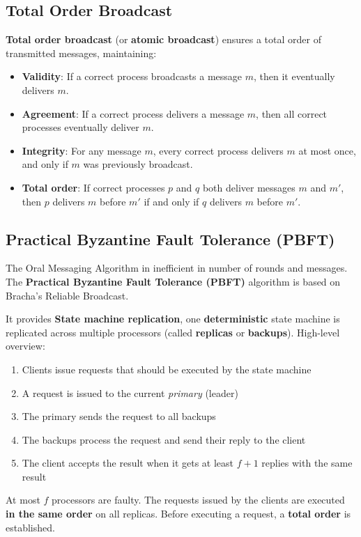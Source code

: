 \documentclass[12pt,A4]{extarticle}
\newcommand{\highlight}[1]{\textcolor{highlightColor}{\textbf{#1}}}
\begin{document}
\subsection{Total Order Broadcast}
\highlight{Total order broadcast} (or \textbf{atomic broadcast}) ensures a total order of transmitted messages, maintaining:
\begin{itemize}
  \item \highlight{Validity}: If a correct process broadcasts a message $m$, then it eventually delivers $m$.
  \item \highlight{Agreement}: If a correct process delivers a message $m$, then all correct processes eventually deliver $m$.
  \item \highlight{Integrity}: For any message $m$, every correct process delivers $m$ at most once, and only if $m$ was previously broadcast.
  \item \highlight{Total order}: If correct processes $p$ and $q$ both deliver messages $m$ and $m'$, then $p$ delivers $m$ before $m'$ if and only if $q$ delivers $m$ before $m'$.
\end{itemize}

\subsection{Practical Byzantine Fault Tolerance (PBFT)}
The Oral Messaging Algorithm in inefficient in number of rounds and messages. The \highlight{Practical Byzantine Fault Tolerance (PBFT)} \cite{PBFT} algorithm is based on Bracha's Reliable Broadcast.\par
It provides \textbf{State machine replication}, one \textbf{deterministic} state machine is replicated across multiple processors (called \textbf{replicas} or \textbf{backups}). High-level overview:
\begin{enumerate}
  \item{Clients issue requests that should be executed by the state machine}
  \item{A request is issued to the current \textit{primary} (leader)}
  \item{The primary sends the request to all backups}
  \item{The backups process the request and send their reply to the client}
  \item{The client accepts the result when it gets at least $f+1$ replies with the same result}
\end{enumerate}
At most $f$ processors are faulty. The requests issued by the clients are executed \textbf{in the same order} on all replicas. Before executing a request, a \textbf{total order} is established.
\end{document}
